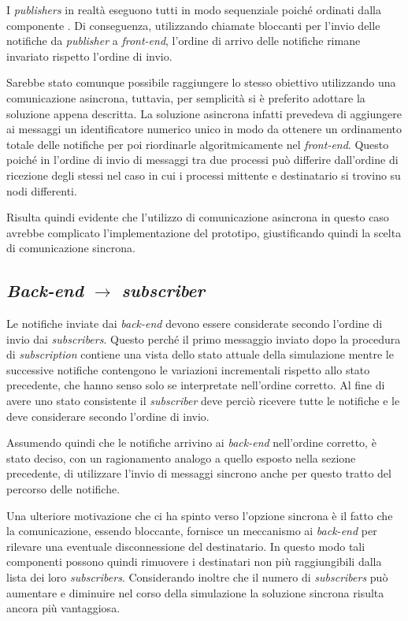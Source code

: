 I \textit{publishers} in realtà eseguono tutti in modo sequenziale poiché ordinati dalla componente \sched{}. Di conseguenza, utilizzando chiamate bloccanti per l'invio delle notifiche da \textit{publisher} a \textit{front-end}, l'ordine di arrivo delle notifiche rimane invariato rispetto l'ordine di invio.

Sarebbe stato comunque possibile raggiungere lo stesso obiettivo utilizzando una comunicazione asincrona, tuttavia, per semplicità si è preferito adottare la soluzione appena descritta. La soluzione asincrona infatti prevedeva di aggiungere ai messaggi un identificatore numerico unico in modo da ottenere un ordinamento totale delle notifiche per poi riordinarle algoritmicamente nel \textit{front-end}. Questo poiché in \Erlang{} l'ordine di invio di messaggi tra due processi può differire dall'ordine di ricezione degli stessi nel caso in cui i processi mittente e destinatario si trovino su nodi differenti.

Risulta quindi evidente che l'utilizzo di comunicazione asincrona in questo caso avrebbe complicato l'implementazione del prototipo, giustificando quindi la scelta di comunicazione sincrona.

\subsection*{\textit{Back-end} $\rightarrow$ \textit{subscriber}}
Le notifiche inviate dai \textit{back-end} devono essere considerate secondo l'ordine di invio dai \textit{subscribers}. Questo perché il primo messaggio inviato dopo la procedura di \textit{subscription} contiene una vista dello stato attuale della simulazione mentre le successive notifiche contengono le variazioni incrementali rispetto allo stato precedente, che hanno senso solo se interpretate nell'ordine corretto. Al fine di avere uno stato consistente il \textit{subscriber} deve perciò ricevere tutte le notifiche e le deve considerare secondo l'ordine di invio.

Assumendo quindi che le notifiche arrivino ai \textit{back-end} nell'ordine corretto, è stato deciso, con un ragionamento analogo a quello esposto nella sezione precedente, di utilizzare l'invio di messaggi sincrono anche per questo tratto del percorso delle notifiche.

Una ulteriore motivazione che ci ha spinto verso l'opzione sincrona è il fatto che la comunicazione, essendo bloccante, fornisce un meccanismo ai \textit{back-end} per rilevare una eventuale disconnessione del destinatario. In questo modo tali componenti possono quindi rimuovere i destinatari non più raggiungibili dalla lista dei loro \textit{subscribers}. Considerando inoltre che il numero di \textit{subscribers} può aumentare e diminuire nel corso della simulazione la soluzione sincrona risulta ancora più vantaggiosa.

